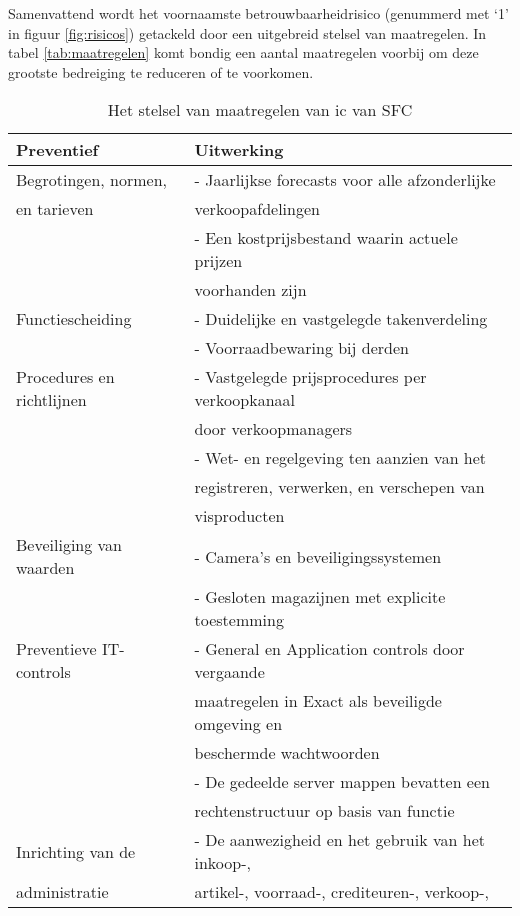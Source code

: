 Samenvattend wordt het voornaamste betrouwbaarheidrisico (genummerd met `1' in figuur \ref{fig:risicos}) getackeld door een uitgebreid stelsel van maatregelen. In tabel \ref{tab:maatregelen} komt bondig een aantal maatregelen voorbij om deze grootste bedreiging te reduceren of te voorkomen.

\newpage

\begin{table}[h!]
    \centering
    \caption{Het stelsel van maatregelen van \gls{ic} van SFC \citep{aoibsfc}}
    \begin{tabular}{l l}
        \toprule
        \textbf{Preventief} & \textbf{Uitwerking} \\
        \midrule
        Begrotingen, normen, & - Jaarlijkse forecasts voor alle afzonderlijke \\
        en tarieven & verkoopafdelingen \\
         & - Een kostprijsbestand waarin actuele prijzen \\
         & voorhanden zijn \\
        Functiescheiding &  - Duidelijke en vastgelegde takenverdeling \\
         & - Voorraadbewaring bij derden \\
        Procedures en richtlijnen & - Vastgelegde prijsprocedures per verkoopkanaal \\
         & door verkoopmanagers \\
         & - Wet- en regelgeving ten aanzien van het \\
         & registreren, verwerken, en verschepen van \\
         & visproducten \\ 
        Beveiliging van waarden & - Camera's en beveiligingssystemen \\
        & - Gesloten magazijnen met explicite toestemming \\
        Preventieve IT-controls & - General en Application controls door vergaande \\
         & maatregelen in Exact als beveiligde omgeving en \\
         & beschermde wachtwoorden \\
         & - De gedeelde server mappen bevatten een \\
         & rechtenstructuur op basis van functie \\
        Inrichting van de & - De aanwezigheid en het gebruik van het inkoop-,\\
        administratie & artikel-, voorraad-, crediteuren-, verkoop-, \\

\end{tabular}
\end{table}
